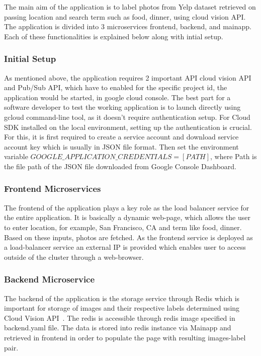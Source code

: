 The main aim of the application is to label photos from Yelp dataset
retrieved on passing location and search term such as food, dinner,
using cloud vision API. The application is divided into 3
microservices frontend, backend, and mainapp. Each of these
functionalities is explained below along with intial setup.

\subsubsection{Initial Setup} 

As mentioned above, the application requires 2 important API cloud
vision API and Pub/Sub API, which have to enabled for the specific
project id, the application would be started, in google cloud
console. The best part for a software developer to test the working
application is to launch directly using gcloud command-line tool, as
it doesn’t require authentication setup.  For Cloud SDK installed on
the local environment, setting up the authentication is crucial. For
this, it is first required to create a service account and download
service account key which is usually in JSON file format. Then set the
environment variable \(GOOGLE\_APPLICATION\_CREDENTIALS = [PATH]\),
where Path is the file path of the JSON file downloaded from Google
Console Dashboard.

\subsubsection{Frontend Microservices} 

The frontend of the application plays a key role as the load balancer
service for the entire application. It is basically a dynamic
web-page, which allows the user to enter location, for example, San
Francisco, CA and term like food, dinner. Based on these inputs,
photos are fetched. As the frontend service is deployed as a
load-balancer service an external IP is provided which enables user to
access outside of the cluster through a web-browser.

\subsubsection{Backend Microservice} 

The backend of the application is the storage service through Redis
which is important for storage of images and their respective labels
determined using Cloud Vision API~\cite{hid-sp18-602-redis}. The redis
is accessible through redis image specified in backend.yaml file. The
data is stored into redis instance via Mainapp and retrieved in
frontend in order to populate the page with resulting images-label
pair.

